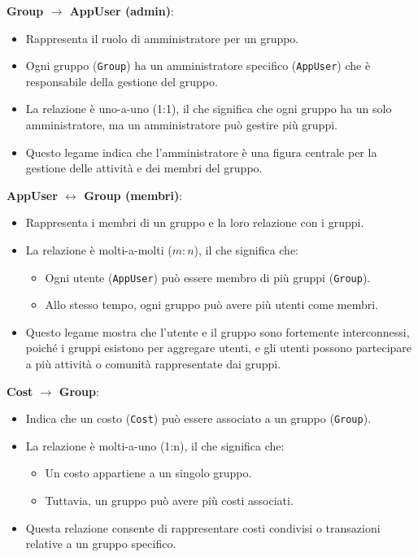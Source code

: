 \textbf{Group $\rightarrow$ AppUser (admin)}: \begin{itemize} \item Rappresenta il ruolo di amministratore per un gruppo. \item Ogni gruppo (\texttt{Group}) ha un amministratore specifico (\texttt{AppUser}) che è responsabile della gestione del gruppo. \item La relazione è uno-a-uno (1:1), il che significa che ogni gruppo ha un solo amministratore, ma un amministratore può gestire più gruppi. \item Questo legame indica che l'amministratore è una figura centrale per la gestione delle attività e dei membri del gruppo. \end{itemize}
\textbf{AppUser $\leftrightarrow$ Group (membri)}: \begin{itemize} \item Rappresenta i membri di un gruppo e la loro relazione con i gruppi. \item La relazione è molti-a-molti ($m:n$), il che significa che: \begin{itemize} \item Ogni utente (\texttt{AppUser}) può essere membro di più gruppi (\texttt{Group}). \item Allo stesso tempo, ogni gruppo può avere più utenti come membri. \end{itemize} \item Questo legame mostra che l'utente e il gruppo sono fortemente interconnessi, poiché i gruppi esistono per aggregare utenti, e gli utenti possono partecipare a più attività o comunità rappresentate dai gruppi. \end{itemize}
\textbf{Cost $\rightarrow$ Group}: \begin{itemize} \item Indica che un costo (\texttt{Cost}) può essere associato a un gruppo (\texttt{Group}). \item La relazione è molti-a-uno (1:n), il che significa che: \begin{itemize} \item Un costo appartiene a un singolo gruppo. \item Tuttavia, un gruppo può avere più costi associati. \end{itemize} \item Questa relazione consente di rappresentare costi condivisi o transazioni relative a un gruppo specifico. \end{itemize}
